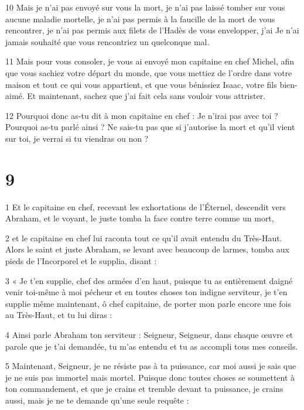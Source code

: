 \par 10 Mais je n'ai pas envoyé sur vous la mort, je n'ai pas laissé tomber sur vous aucune maladie mortelle, je n'ai pas permis à la faucille de la mort de vous rencontrer, je n'ai pas permis aux filets de l'Hadès de vous envelopper, j'ai Je n'ai jamais souhaité que vous rencontriez un quelconque mal.

\par 11 Mais pour vous consoler, je vous ai envoyé mon capitaine en chef Michel, afin que vous sachiez votre départ du monde, que vous mettiez de l'ordre dans votre maison et tout ce qui vous appartient, et que vous bénissiez Isaac, votre fils bien-aimé. Et maintenant, sachez que j'ai fait cela sans vouloir vous attrister.

\par 12 Pourquoi donc as-tu dit à mon capitaine en chef : Je n'irai pas avec toi ? Pourquoi as-tu parlé ainsi ? Ne sais-tu pas que si j'autorise la mort et qu'il vient sur toi, je verrai si tu viendras ou non ?

\chapter{9}

\par 1 Et le capitaine en chef, recevant les exhortations de l'Éternel, descendit vers Abraham, et le voyant, le juste tomba la face contre terre comme un mort,

\par 2 et le capitaine en chef lui raconta tout ce qu'il avait entendu du Très-Haut. Alors le saint et juste Abraham, se levant avec beaucoup de larmes, tomba aux pieds de l'Incorporel et le supplia, disant :

\par 3 « Je t'en supplie, chef des armées d'en haut, puisque tu as entièrement daigné venir toi-même à moi pécheur et en toutes choses ton indigne serviteur, je t'en supplie même maintenant, ô chef capitaine, de porter mon parle encore une fois au Très-Haut, et tu lui diras :

\par 4 Ainsi parle Abraham ton serviteur : Seigneur, Seigneur, dans chaque œuvre et parole que je t'ai demandée, tu m'as entendu et tu as accompli tous mes conseils.

\par 5 Maintenant, Seigneur, je ne résiste pas à ta puissance, car moi aussi je sais que je ne suis pas immortel mais mortel. Puisque donc toutes choses se soumettent à ton commandement, et que je crains et tremble devant ta puissance, je crains aussi, mais je ne te demande qu'une seule requête :

